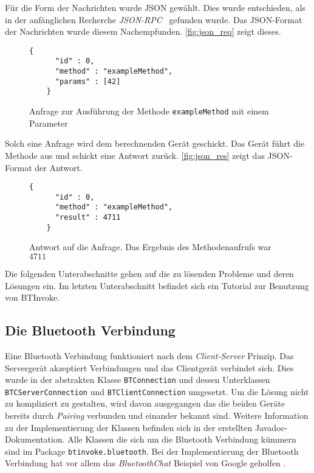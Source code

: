 Für die Form der Nachrichten wurde JSON gewählt. Dies wurde entschieden, als in der anfänglichen Recherche \emph{JSON-RPC}~\cite{JSON-RPCWorkingGroup2013} gefunden wurde. Das JSON-Format der Nachrichten wurde diesem Nachempfunden. \autoref{fig:json_req} zeigt dieses.
\begin{figure}[htb]
  \centering
  \begin{lstlisting}[basicstyle=\ttfamily\scriptsize]
    {
      "id" : 0,
      "method" : "exampleMethod",
      "params" : [42]
    }
  \end{lstlisting}
  \caption{Anfrage zur Ausführung der Methode \lstinline|exampleMethod| mit einem Parameter}
  \label{fig:json_req}
\end{figure}
Solch eine Anfrage wird dem berechnenden Gerät geschickt. Das Gerät führt die Methode aus und schickt eine Antwort zurück. \autoref{fig:json_res} zeigt das JSON-Format der Antwort.
\begin{figure}[htb]
  \centering
  \begin{lstlisting}[basicstyle=\ttfamily\scriptsize]
    {
      "id" : 0,
      "method" : "exampleMethod",
      "result" : 4711
    }
  \end{lstlisting}
  \caption{Antwort auf die Anfrage. Das Ergebnis des Methodenaufrufs war $4711$}
  \label{fig:json_res}
\end{figure}

Die folgenden Unterabschnitte gehen auf die zu lösenden Probleme und deren Lösungen ein. Im letzten Unterabschnitt befindet sich ein Tutorial zur Benutzung von BTInvoke. 
%
\subsection{Die Bluetooth Verbindung}
%
\begin{sloppypar}
Eine Bluetooth Verbindung funktioniert nach dem \emph{Client-Server} Prinzip. Das Servergerät akzeptiert Verbindungen und das Clientgerät verbindet sich. Dies wurde in der abstrakten Klasse \lstinline|BTConnection| und dessen Unterklassen \lstinline|BTCServerConnection| und \lstinline|BTClientConnection| umgesetzt. Um die Lösung nicht zu kompliziert zu gestalten, wird davon ausgegangen das die beiden Geräte bereits durch \emph{Pairing} verbunden und einander bekannt sind. Weitere Information zu der Implementierung der Klassen befinden sich in der erstellten Javadoc-Dokumentation. Alle Klassen die sich um die Bluetooth Verbindung kümmern sind im Package \lstinline|btinvoke.bluetooth|. Bei der Implementierung der Bluetooth Verbindung hat vor allem das \emph{BluetoothChat} Beispiel von Google geholfen \cite{GoogleInc.2014}.
\end{sloppypar}

